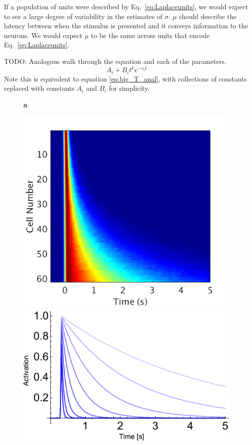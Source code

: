 \documentclass{apa}
\begin{document}
If a population of units were described by Eq.~\ref{eq:Laplaceunits}, we would
expect to see a large degree of variability in the estimates of $\sigma$.  
$\mu$ should describe the latency between when the stimulus is presented and
it conveys information to the neurons.  We would expect $\mu$ to be the same
across units that encode Eq.~\ref{eq:Laplaceunits}.

TODO: Analogous walk through the equation and each of the parameters.
\begin{equation}
		A_i + B_i  t^k e^{ -s_i t}
\end{equation}
Note this is equivalent to equation \eqref{eq:big_T_anal}, with collections of constants replaced with constants $A_i$ and $B_i$ for simplicity.
\begin{figure}
	\begin{minipage}{.25\linewidth}
		\textbf{a}
		\begin{center}
			\includegraphics[width=.99\linewidth]{figs/HeatmapExpDecayV2.png}
			\includegraphics[width=.99\linewidth]{figs/ExpDecParams.pdf}

\end{center}
\end{minipage}
\end{figure}
\end{document}
